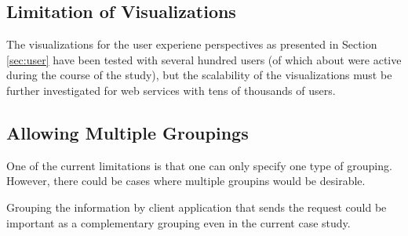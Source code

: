   \subsection*{Limitation of Visualizations }

    The visualizations for the user experiene perspectives as presented in Section \ref{sec:user} have been tested with several hundred users (of which about \activeUserCount were active during the course of the study), but the scalability of the visualizations must be further investigated for web services with tens of thousands of users.


  \subsection*{Allowing Multiple Groupings}

  One of the current limitations is that one can only specify one type of grouping. 
  However, there could be cases where multiple groupins would be desirable. 
  
  Grouping the information by client application that sends the request could be important as a complementary grouping even in the current \zee case study. 

